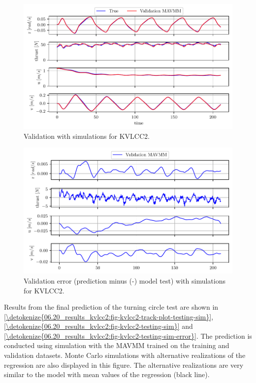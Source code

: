\begin{figure}[h]
\centering
\includegraphics[width=1.0\textwidth]{kappa/images/15.pdf}
\caption{Validation with simulations for KVLCC2.}\label{\detokenize{06.20_results_kvlcc2:fig-kvlcc2-validation-sim}}\end{figure}
\begin{figure}[h]
\centering
\includegraphics[width=1.0\textwidth]{kappa/images/16.pdf}
\caption{Validation error (prediction minus (-) model test) with simulations for KVLCC2.}\label{\detokenize{06.20_results_kvlcc2:fig-kvlcc2-validation-sim-error}}\end{figure}
\clearpage
\noindent Results from the final prediction of the turning circle test are shown in  \hyperref[\detokenize{06.20_results_kvlcc2:fig-kvlcc2-track-plot-testing-sim}]{\autoref{\detokenize{06.20_results_kvlcc2:fig-kvlcc2-track-plot-testing-sim}}}, \hyperref[\detokenize{06.20_results_kvlcc2:fig-kvlcc2-testing-sim}]{\autoref{\detokenize{06.20_results_kvlcc2:fig-kvlcc2-testing-sim}}} and \hyperref[\detokenize{06.20_results_kvlcc2:fig-kvlcc2-testing-sim-error}]{\autoref{\detokenize{06.20_results_kvlcc2:fig-kvlcc2-testing-sim-error}}}. The prediction is conducted using simulation with the MAVMM trained on the training and validation datasets. Monte Carlo simulations with alternative realizations of the regression are also displayed in this figure. The alternative realizations are very similar to the model with mean values of the regression (black line).
